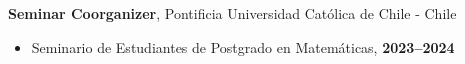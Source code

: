 \documentclass[margin,line]{res}
\begin{document}
\begin{resume}
{\bf Seminar Coorganizer}, Pontificia Universidad Católica de Chile - Chile
\vspace*{.05in}
\begin{itemize}
\item[]
  Seminario de Estudiantes de Postgrado en Matemáticas, \hfill {\bf 2023--2024}\\
  
\end{itemize}










\end{resume}
\end{document}
